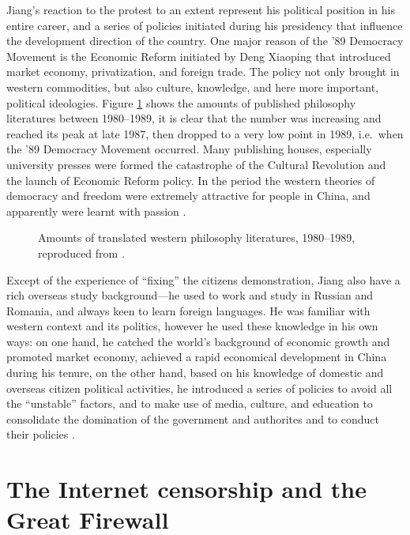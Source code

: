 Jiang's reaction to the protest to an extent represent his political position in his entire career, and a series of policies initiated during his presidency that influence the development direction of the country. One major reason of the '89 Democracy Movement is the Economic Reform initiated by Deng Xiaoping that introduced market economy, privatization, and foreign trade. The policy not only brought in western commodities, but also culture, knowledge, and here more important, political ideologies. Figure \ref{fig:westbook} shows the amounts of published philosophy literatures between 1980--1989, it is clear that the number was increasing and reached its peak at late 1987, then dropped to a very low point in 1989, i.e.\ when the '89 Democracy Movement occurred. Many publishing houses, especially university presses were formed the catastrophe of the Cultural Revolution and the launch of Economic Reform policy. In the period the western theories of democracy and freedom were extremely attractive for people in China, and apparently were learnt with passion \citep{__2011}.
\begin{figure}[!htbp]
	\centering
	
	\caption[Amounts of translated western philosophy literatures, 1980--1989]{Amounts of translated western philosophy literatures, 1980--1989, reproduced from \citet{__2011}.}
	\label{fig:westbook}
\end{figure}

Except of the experience of ``fixing'' the citizens demonstration, Jiang also have a rich overseas study background---he used to work and study in Russian and Romania, and always keen to learn foreign languages. He was familiar with western context and its politics, however he used these knowledge in his own ways: on one hand, he catched the world's background of economic growth and promoted market economy, achieved a rapid economical development in China during his tenure, on the other hand, based on his knowledge of domestic and overseas citizen political activities, he introduced a series of policies to avoid all the ``unstable''  factors, and to make use of media, culture, and education to consolidate the domination of the government and authorites and to conduct their policies \citep{kuhn_man_2005,__2004}.

\section{The Internet censorship and the Great Firewall}

